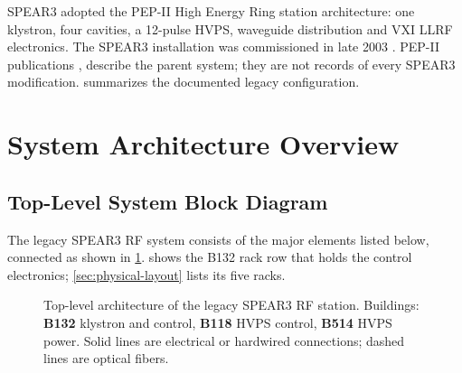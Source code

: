 SPEAR3 adopted the PEP-II High Energy Ring station architecture: one klystron, four cavities, a 12-pulse HVPS, waveguide distribution and VXI LLRF electronics. The SPEAR3 installation was commissioned in late 2003 . PEP-II publications ,  describe the parent system; they are not records of every SPEAR3 modification.  summarizes the documented legacy configuration.


\section{System Architecture Overview}

\subsection{Top-Level System Block Diagram}

The legacy SPEAR3 RF system consists of the major elements listed below, connected as shown in \cref{fig:system-overview}.  shows the B132 rack row that holds the control electronics; \cref{sec:physical-layout} lists its five racks.

\begin{figure}[p]
\centering
\caption{Top-level architecture of the legacy SPEAR3 RF station.  Buildings:
  \textbf{B132} klystron and control, \textbf{B118} HVPS control,
  \textbf{B514} HVPS power.  Solid lines are electrical or hardwired
  connections; dashed lines are optical fibers.}\label{fig:system-overview}
\end{figure}

